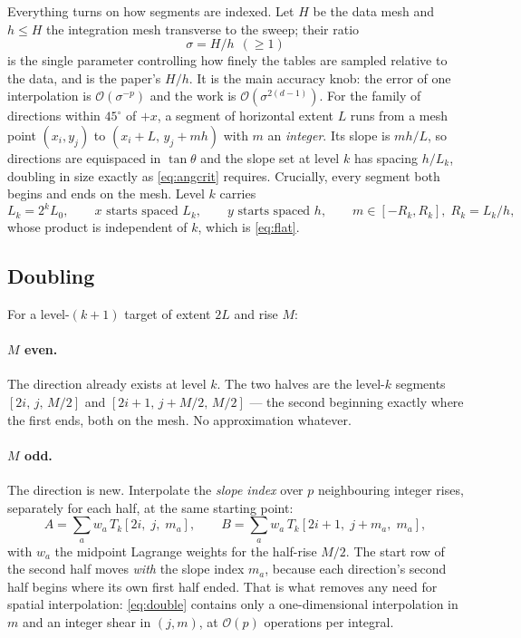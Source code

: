 \documentclass[11pt]{article}
\newcommand{\bigO}{\mathcal{O}}
\begin{document}
Everything turns on how segments are indexed. Let $H$ be the data mesh and
$h \le H$ the integration mesh transverse to the sweep; their ratio
\begin{equation}
  \sigma = H/h \ \ (\ge 1)
  \label{eq:sigma}
\end{equation}
is the single parameter controlling how finely the tables are sampled relative
to the data, and is the paper's $H/h$. It is the main accuracy knob: the error
of one interpolation is $\bigO(\sigma^{-p})$ and the work is
$\bigO(\sigma^{2(d-1)})$. For the family of
directions within $45^\circ$ of $+x$, a segment of horizontal extent $L$ runs
from a mesh point $(x_i, y_j)$ to $(x_i + L,\, y_j + m h)$ with $m$ an
\emph{integer}. Its slope is $mh/L$, so directions are equispaced in $\tan\theta$
and the slope set at level $k$ has spacing $h/L_k$, doubling in size exactly as
\eqref{eq:angcrit} requires. Crucially, every segment both begins and ends on
the mesh. Level $k$ carries
\begin{equation}
  L_k = 2^k L_0, \qquad
  x\text{ starts spaced } L_k, \qquad
  y\text{ starts spaced } h, \qquad
  m \in [-R_k, R_k],\; R_k = L_k/h,
\end{equation}
whose product is independent of $k$, which is \eqref{eq:flat}.

\subsection{Doubling}

For a level-$(k+1)$ target of extent $2L$ and rise $M$:

\paragraph{$M$ even.} The direction already exists at level $k$. The two halves
are the level-$k$ segments $[2i,\, j,\, M/2]$ and $[2i+1,\, j + M/2,\, M/2]$ ---
the second beginning exactly where the first ends, both on the mesh. No
approximation whatever.

\paragraph{$M$ odd.} The direction is new. Interpolate the \emph{slope index}
over $p$ neighbouring integer rises, separately for each half, at the same
starting point:
\begin{equation}
  A = \sum_a w_a\, T_k[2i,\; j,\; m_a], \qquad
  B = \sum_a w_a\, T_k[2i+1,\; j + m_a,\; m_a],
  \label{eq:double}
\end{equation}
with $w_a$ the midpoint Lagrange weights for the half-rise $M/2$. The start row
of the second half moves \emph{with} the slope index $m_a$, because each
direction's second half begins where its own first half ended. That is what
removes any need for spatial interpolation: \eqref{eq:double} contains only a
one-dimensional interpolation in $m$ and an integer shear in $(j,m)$, at
$\bigO(p)$ operations per integral.
\end{document}
